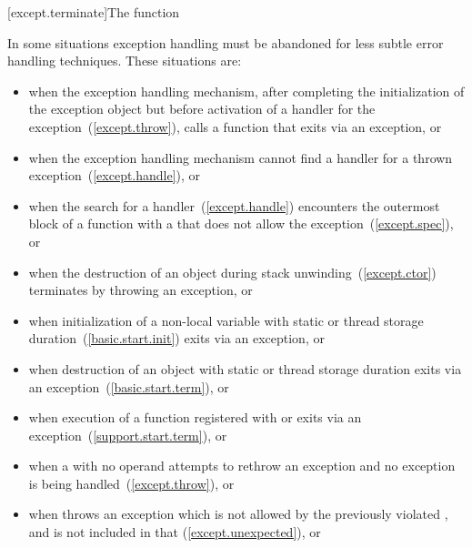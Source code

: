 [except.terminate]{The  function}

\pnum
{}%
In some situations exception handling must be abandoned
for less subtle error handling techniques. \enternote These situations are:

%
\begin{itemize}
\item%
when the exception handling mechanism, after completing
the initialization of the exception object
but before
activation of a handler for the exception~(\ref{except.throw}),
calls a function that exits
via an exception, or

\item%
when the exception handling mechanism cannot find a handler for a thrown exception~(\ref{except.handle}), or

\item when the search for a handler~(\ref{except.handle}) encounters the
outermost block of a function with a 
that does not allow the exception~(\ref{except.spec}), or

\item%
when the destruction of an object during stack unwinding~(\ref{except.ctor})
terminates by throwing an exception, or

\item%
when initialization of a non-local
variable with static or thread storage duration~(\ref{basic.start.init})
exits via an exception, or

\item%
when destruction of an object with static or thread storage duration exits
via an exception~(\ref{basic.start.term}), or

\item%
when execution of a function registered with
 or 
exits via an exception~(\ref{support.start.term}), or

\item%
when a
with no operand attempts to rethrow an exception and no exception is being
handled~(\ref{except.throw}), or

\item%
when
throws an exception which is not allowed by the previously violated
,
and
is not included in that
 (\ref{except.unexpected}), or


\end{itemize}
